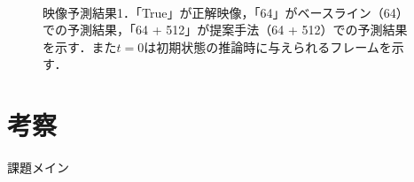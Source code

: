 \documentclass[10pt, twocolumn]{jarticle}
\begin{document}
\begin{figure}[tp]
    \centering
    \\
    \caption[映像予測結果1]{\small 映像予測結果1．「True」が正解映像，「64」がベースライン（64）での予測結果，「64 + 512」が提案手法（64 + 512）での予測結果を示す．また$t = 0$は初期状態の推論時に与えられるフレームを示す．}
    \label{fig:compare_ad}
\end{figure}

\section{考察}
課題メイン
\end{document}
